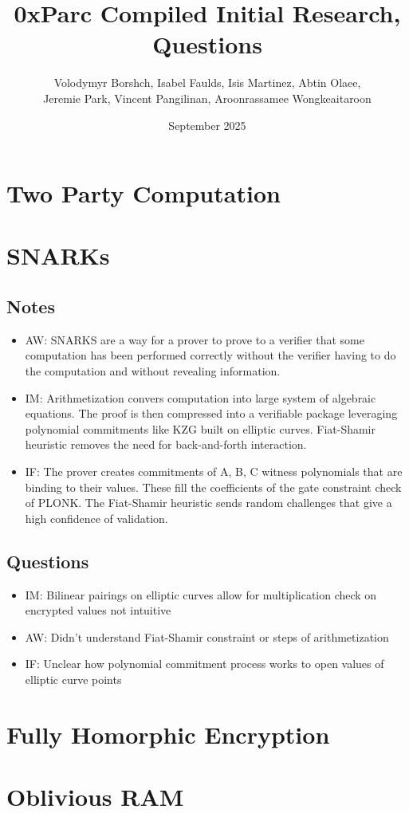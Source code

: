 \documentclass{article}
\title{0xParc Compiled Initial Research, Questions}
\author{Volodymyr Borshch, Isabel Faulds, Isis Martinez, Abtin Olaee,\\ Jeremie Park, Vincent Pangilinan, Aroonrassamee Wongkeaitaroon}
\date{September 2025}
\begin{document}
\maketitle

\section{Two Party Computation}
\section{SNARKs}

\subsection*{Notes}
\begin{itemize}
\item AW: SNARKS are a way for a prover to prove to a verifier that some computation has been performed correctly without the verifier having to do the computation and without revealing information.
\item IM: Arithmetization convers computation into large system of algebraic equations. The proof is then compressed into a verifiable package leveraging polynomial commitments like KZG built on elliptic curves. Fiat-Shamir heuristic removes the need for back-and-forth interaction.
\item IF: The prover creates commitments of A, B, C witness polynomials that are binding to their values. These fill the coefficients of the gate constraint check of PLONK. The Fiat-Shamir heuristic sends random challenges that give a high confidence of validation.
\end{itemize}


\subsection*{Questions}
\begin{itemize}
\item IM: Bilinear pairings on elliptic curves allow for multiplication check on encrypted values not intuitive
\item AW: Didn't understand Fiat-Shamir constraint or steps of arithmetization
\item IF: Unclear how polynomial commitment process works to open values of elliptic curve points
\end{itemize}

\section{Fully Homorphic Encryption}

\section{Oblivious RAM}
\end{document}
